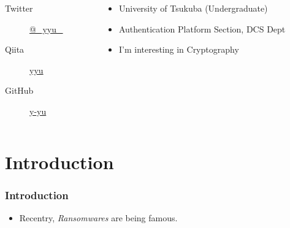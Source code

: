 \begin{frame}
\begin{columns}
\begin{column}{0.3\textwidth}
      \begin{description}
        \item[Twitter] \href{https://twitter.com/\_yyu\_}{@\_yyu\_}
        \item[Qiita] \href{http://qiita.com/yyu}{yyu}
        \item[GitHub] \href{https://github.com/y-yu}{y-yu}
      \end{description}
    \end{column}
    \begin{column}{0.7\textwidth}
      \begin{itemize}
        \item<2-> University of Tsukuba (Undergraduate)
        \item<3-> Authentication Platform Section, DCS Dept
        \item<4-> I'm interesting in Cryptography
      \end{itemize}
    \end{column}
  \end{columns}
\end{frame}

\section{Introduction}

\begin{frame}
  \frametitle{Introduction}

  \begin{itemize}
    \item<2-> Recentry, \emph{Ransomwares} are being famous.
  \end{itemize}



  \begin{center}
  \end{center} 
\end{frame}

